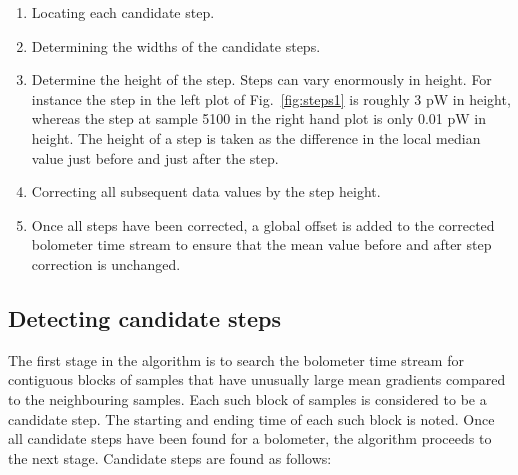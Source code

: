 \documentclass[useAMS,usenatbib,nofootinbib]{mn2e}
\begin{document}
\begin{enumerate}

\item Locating each candidate step.

\item Determining the widths of the candidate steps.

\item Determine the height of the step. Steps can vary enormously in height.
For instance the step in the left plot of Fig.~\ref{fig:steps1} is
roughly 3 pW in height, whereas the step at sample 5100 in the right hand
plot is only 0.01 pW in height. The height of a step is taken as the
difference in the local median value just before and just after the step.

\item Correcting all subsequent data values by the step height.

\item Once all steps have been corrected, a global offset is added to the
corrected bolometer time stream to ensure that the mean value before and
after step correction is unchanged.

\end{enumerate}

\subsection{Detecting candidate steps}
The first stage in the algorithm is to search the bolometer time stream for
contiguous blocks of samples that have unusually large mean gradients
compared to the neighbouring samples. Each such block of samples is
considered to be a candidate step. The starting and ending time of each
such block is noted. Once all candidate steps have been found for a
bolometer, the algorithm proceeds to the next stage. Candidate steps are
found as follows:
\end{document}
